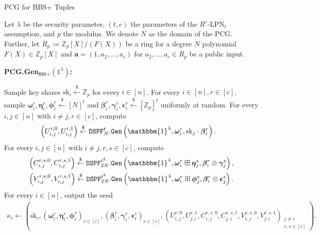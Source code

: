 \begin{specialconstruction}{PCG for BBS+ Tuples}
\label{construction:PCGforBBS+}
\vspace{1em}

Let $\lambda$ be the security parameter, $(t,c)$ the parameters of the $R^c$-LPN$_t$ assumption, and $p$ the modulus. We denote $N$ as the domain of the PCG. Further, let $R_p:=\mathbb{Z}_{p}[X]/(F(X))$ be a ring for a degree $N$ polynomial $F(X) \in \mathbb{Z}_{p}[X]$ and $\boldsymbol{a} = (1, a_2, ..., a_c)$ for $a_2, ...,a_c \in R_p$ be a public input.

\vspace{1em}

\textbf{PCG.Gen$_{\texttt{BBS+}}(1^\lambda)$:}

\begin{algorithmic}[1]
\State Sample key shares $\mathrm{sk}_{i} \stackrel{\$}{\leftarrow} \mathbb{Z}_{p}$ for every $i \in [n]$.
\State For every $i \in [n], r \in [c]$, sample $\boldsymbol{\omega}_{i}^{r}, \boldsymbol{\eta}_{i}^{r}, \boldsymbol{\phi}_{i}^{r} \stackrel{\$}{\leftarrow} [N]^{t}$ and $\boldsymbol{\beta}_{i}^{r}, \boldsymbol{\gamma}_{i}^{r}, \boldsymbol{\epsilon}_{i}^{r} \stackrel{\$}{\leftarrow} [\mathbb{Z}_{p}]^{t}$ uniformly at random.
\State For every $i, j \in [n]$ with $i \neq j, r \in [c]$, compute
\begin{align*}
& \left(U_{i, j}^{r, 0}, U_{i, j}^{r, 1}\right) \stackrel{\$}{\leftarrow} \texttt{DSPF}_{N}^{t}.\texttt{Gen}\left(\mathbbm{1}^{\lambda}, \boldsymbol{\omega}_{i}^{r}, \mathrm{sk}_{j} \cdot \boldsymbol{\beta}_{i}^{r}\right).
\end{align*}
\State For every $i, j \in [n]$ with $i \neq j, r, s \in [c]$, compute
\begin{align*}
& \left(C_{i, j}^{r, s, 0}, C_{i, j}^{r, s, 1}\right)\stackrel{\$}{\leftarrow} \texttt{DSPF}_{2N}^{t^{2}}.\texttt{Gen}\left(\mathbbm{1}^{\lambda}, \boldsymbol{\omega}_{i}^{r} \boxplus \boldsymbol{\eta}_{j}^{s}, \boldsymbol{\beta}_{i}^{r} \otimes \boldsymbol{\gamma}_{j}^{s}\right), \\
& \left(V_{i, j}^{r, s, 0}, V_{i, j}^{r, s, 1}\right) \stackrel{\$}{\leftarrow} \texttt{DSPF}_{2N}^{t^{2}}.\texttt{Gen}\left(\mathbbm{1}^{\lambda}, \boldsymbol{\omega}_{i}^{r} \boxplus \boldsymbol{\phi}_{j}^{s}, \boldsymbol{\beta}_{i}^{r} \otimes \boldsymbol{\epsilon}_{j}^{s}\right).
\end{align*}
\State For every $i \in [n]$, output the seed
\begin{align*}
\kappa_{i} \leftarrow\left(\mathrm{sk}_{i},\left(\boldsymbol{\omega}_{i}^{r}, \boldsymbol{\eta}_{i}^{r}, \boldsymbol{\phi}_{i}^{r}\right)_{r \in [c]},\left(\boldsymbol{\beta}_{i}^{r}, \boldsymbol{\gamma}_{i}^{r}, \boldsymbol{\epsilon}_{i}^{r}\right)_{r \in [c]},\left(U_{i, j}^{r, 0}, U_{j, i}^{r, 1}, C_{i, j}^{r, s, 0}, C_{j, i}^{r, s, 1}, V_{i, j}^{r, s, 0}, V_{j, i}^{r, s, 1}\right)_{\substack{j \neq i \\ r, s \in [c]}}\right).
\end{align*}
\end{algorithmic}


\end{specialconstruction}
